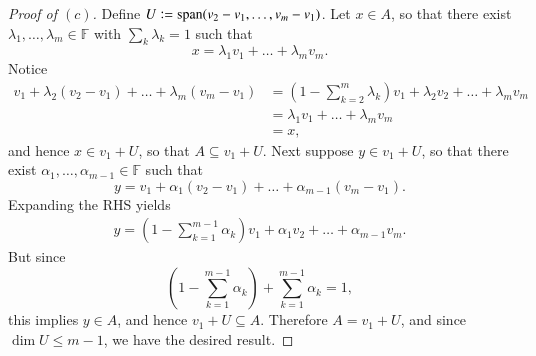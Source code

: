 \documentclass[11pt]{extarticle}
\newcommand{\F}{\mathbb{F}}
\DeclareMathOperator{\Span}{span}
\newcommand{\defeq}{\vcentcolon=}
\begin{document}
\begin{proof}[Proof of $(c)$]
Define $U \defeq \Span(v_2 - v_1, \dots, v_m - v_1)$.  Let $x\in A$, so that there exist $\lambda_1,\dots, \lambda_m\in\F$ with $\sum_k\lambda_k = 1$ such that
\begin{equation*}
x = \lambda_1v_1 + \dots + \lambda_mv_m.
\end{equation*}
Notice
\begin{align*}
v_1 + \lambda_2(v_2 - v_1) + \dots + \lambda_m(v_m - v_1) &= \left(1 - \sum_{k = 2}^m\lambda_k\right)v_1 + \lambda_2v_2 + \dots + \lambda_mv_m\\
&= \lambda_1v_1 + \dots +\lambda_mv_m\\
&= x,
\end{align*}
and hence $x\in v_1 + U$, so that $A\subseteq v_1 + U$.  Next suppose $y\in v_1 + U$, so that there exist $\alpha_1,\dots,\alpha_{m - 1}\in\F$ such that
\begin{equation*}
y = v_1 + \alpha_1(v_2 - v_1) + \dots + \alpha_{m - 1}(v_m - v_1).
\end{equation*}
Expanding the RHS yields
\begin{align*}
y = \left(1 - \sum_{k = 1}^{m-1}\alpha_k\right)v_1 + \alpha_1v_2 + \dots + \alpha_{m-1}v_m.
\end{align*}
But since 
\begin{equation*}
\left(1 - \sum_{k = 1}^{m-1}\alpha_k\right)+ \sum_{k=1}^{m-1}\alpha_k = 1,
\end{equation*}
this implies $y \in A$, and hence $v_1 + U\subseteq A$.  Therefore $A = v_1 + U$, and since $\dim U \leq m - 1$, we have the desired result.
\end{proof}
\end{document}
